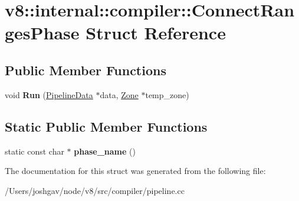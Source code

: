 \hypertarget{structv8_1_1internal_1_1compiler_1_1_connect_ranges_phase}{}\section{v8\+:\+:internal\+:\+:compiler\+:\+:Connect\+Ranges\+Phase Struct Reference}
\label{structv8_1_1internal_1_1compiler_1_1_connect_ranges_phase}
\subsection*{Public Member Functions}
\begin{DoxyCompactItemize}
\item 
void {\bfseries Run} (\hyperlink{classv8_1_1internal_1_1compiler_1_1_pipeline_data}{Pipeline\+Data} $\ast$data, \hyperlink{classv8_1_1internal_1_1_zone}{Zone} $\ast$temp\+\_\+zone)\hypertarget{structv8_1_1internal_1_1compiler_1_1_connect_ranges_phase_ac9dfc51bf2fb6550370250ac5a4822ad}{}\label{structv8_1_1internal_1_1compiler_1_1_connect_ranges_phase_ac9dfc51bf2fb6550370250ac5a4822ad}

\end{DoxyCompactItemize}
\subsection*{Static Public Member Functions}
\begin{DoxyCompactItemize}
\item 
static const char $\ast$ {\bfseries phase\+\_\+name} ()\hypertarget{structv8_1_1internal_1_1compiler_1_1_connect_ranges_phase_acee78a4b072be009998481fcb2fbeb2d}{}\label{structv8_1_1internal_1_1compiler_1_1_connect_ranges_phase_acee78a4b072be009998481fcb2fbeb2d}

\end{DoxyCompactItemize}


The documentation for this struct was generated from the following file\+:\begin{DoxyCompactItemize}
\item 
/\+Users/joshgav/node/v8/src/compiler/pipeline.\+cc\end{DoxyCompactItemize}
